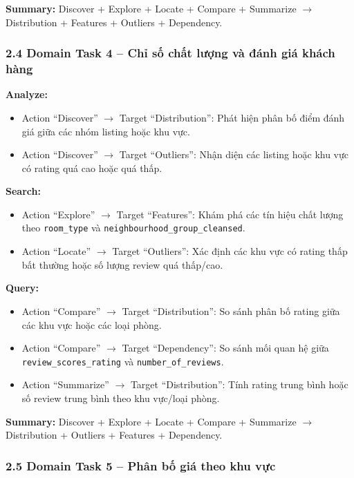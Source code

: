 \textbf{Summary:} Discover + Explore + Locate + Compare + Summarize $\rightarrow$ Distribution + Features + Outliers + Dependency.

\subsubsection*{2.4 Domain Task 4 -- Chỉ số chất lượng và đánh giá khách hàng}

\textbf{Analyze:} 
\begin{itemize}
    \item Action ``Discover'' $\rightarrow$ Target ``Distribution'': Phát hiện phân bố điểm đánh giá giữa các nhóm listing hoặc khu vực. 
    \item Action ``Discover'' $\rightarrow$ Target ``Outliers'': Nhận diện các listing hoặc khu vực có rating quá cao hoặc quá thấp.
\end{itemize}

\textbf{Search:} 
\begin{itemize}
    \item Action ``Explore'' $\rightarrow$ Target ``Features'': Khám phá các tín hiệu chất lượng theo \texttt{room\_type} và \texttt{neighbourhood\_group\_cleansed}. 
    \item Action ``Locate'' $\rightarrow$ Target ``Outliers'': Xác định các khu vực có rating thấp bất thường hoặc số lượng review quá thấp/cao.
\end{itemize}

\textbf{Query:} 
\begin{itemize}
    \item Action ``Compare'' $\rightarrow$ Target ``Distribution'': So sánh phân bố rating giữa các khu vực hoặc các loại phòng. 
    \item Action ``Compare'' $\rightarrow$ Target ``Dependency'': So sánh mối quan hệ giữa \texttt{review\_scores\_rating} và \texttt{number\_of\_reviews}. 
    \item Action ``Summarize'' $\rightarrow$ Target ``Distribution'': Tính rating trung bình hoặc số review trung bình theo khu vực/loại phòng.
\end{itemize}

\textbf{Summary:} Discover + Explore + Locate + Compare + Summarize $\rightarrow$ Distribution + Outliers + Features + Dependency.

\subsubsection*{2.5 Domain Task 5 -- Phân bố giá theo khu vực}

